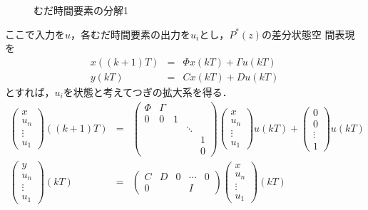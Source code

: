 \begin{figure}[htbp]
 \begin{center}
  \caption{むだ時間要素の分解1}
  \label{fig_delay1}
 \end{center}
\end{figure}

ここで入力を$u$，各むだ時間要素の出力を$u_i$とし，$P^*(z)$の差分状態空
間表現を
\begin{eqnarray*}
 x((k+1)T) &=& \Phi x(kT) + \Gamma u(kT) \\
 y(kT)     &=& C x(kT) + D u(kT)
\end{eqnarray*}
とすれば，$u_i$を状態と考えてつぎの拡大系を得る．
\begin{eqnarray}
 \left(\begin{array}{c}
        x \\
	u_n \\
	\vdots \\
	u_1
       \end{array}\right)
 ((k+1)T) &=&
 \left(\begin{array}{ccccc}
        \Phi & \Gamma &   &        & \\
	0    & 0      & 1 &        & \\
	     &        &   & \ddots & \\
	     &        &   &        & 1 \\
	     &        &   &        & 0
	\end{array}\right)
 \left(\begin{array}{c}
        x \\
	u_n \\
	\vdots \\
	u_1
	\end{array}\right)
 u(kT) +
 \left(\begin{array}{c}
        0 \\
	0 \\
	\vdots \\
	1
	\end{array}\right)
 u(kT) \\
 \left(\begin{array}{c}
        y \\
	u_n \\
	\vdots \\
	u_1
	\end{array}\right)
 (kT) &=&
 \left(\begin{array}{ccccc}
        C & D & 0 & \cdots & 0 \\
	0 &   &   &   I    & 
	\end{array}\right)
 \left(\begin{array}{c}
        x \\
	u_n \\
	\vdots \\
	u_1
       \end{array}\right)
 (kT)
\end{eqnarray}

